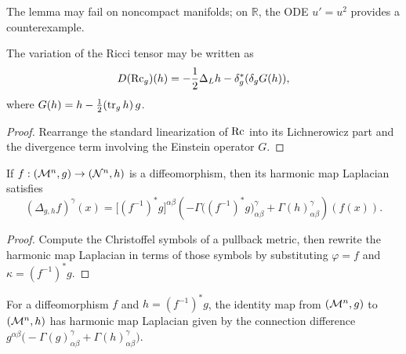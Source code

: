 \begin{remark}
\label{ch03-rem-noncompact-flow-failure}
The lemma may fail on noncompact manifolds; on \(\mathbb R\), the ODE \(u'=u^2\) provides a counterexample.
\end{remark}

\begin{lemma}
\label{ch03-lem-riemann-tensor-decomposition}
The variation of the Ricci tensor may be written as
\[
D(\operatorname{Rc}_g)(h)=-\frac12\Delta_L h-\delta_g^*(\delta_g G(h)),
\]
where \(G(h)=h-\frac12(\operatorname{tr}_g h)\,g\).
\end{lemma}

\begin{proof}
Rearrange the standard linearization of \(\operatorname{Rc}\) into its Lichnerowicz part and the divergence term involving the Einstein operator \(G\).
\end{proof}

\begin{lemma}
\label{ch03-lem-harmonic-map-laplacian}
If \(f:(\mathcal{M}^n,g)\to(\mathcal{N}^n,h)\) is a diffeomorphism, then its harmonic map Laplacian satisfies
\[
(\Delta_{g,h}f)^\gamma(x)
=\bigl[(f^{-1})^*g\bigr]^{\alpha\beta}
\left(-\Gamma\bigl((f^{-1})^*g\bigr)^\gamma_{\alpha\beta}+\Gamma(h)^\gamma_{\alpha\beta}\right)\!(f(x)).
\]
\end{lemma}

\begin{proof}
Compute the Christoffel symbols of a pullback metric, then rewrite the harmonic map Laplacian in terms of those symbols by substituting \(\varphi=f\) and \(\kappa=(f^{-1})^*g\).
\end{proof}

\begin{corollary}
\label{ch03-cor-identity-harmonic-map}
For a diffeomorphism \(f\) and \(h=(f^{-1})^*g\), the identity map from \((\mathcal{M}^n,g)\) to \((\mathcal{M}^n,h)\) has harmonic map Laplacian given by the connection difference \(g^{\alpha\beta}\bigl(-\Gamma(g)^\gamma_{\alpha\beta}+\Gamma(h)^\gamma_{\alpha\beta}\bigr)\).
\end{corollary}

